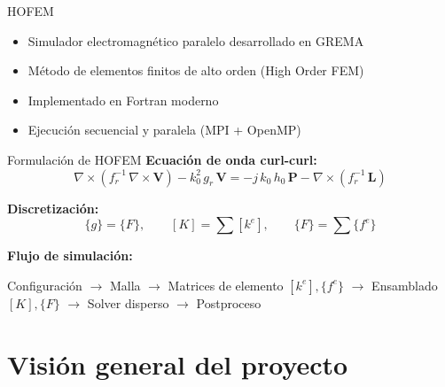 \documentclass[aspectratio=169,11pt]{beamer}
\begin{document}
\begin{frame}{HOFEM}
  \begin{itemize}
    \item Simulador electromagnético paralelo desarrollado en GREMA
    \item Método de elementos finitos de alto orden (High Order FEM)
    \item Implementado en Fortran moderno
    \item Ejecución secuencial y paralela (MPI + OpenMP)
  \end{itemize}
\end{frame}

\begin{frame}{Formulación de HOFEM}
  \textbf{Ecuación de onda curl-curl:}
  \begin{equation*}
    \nabla \times \left(f_r^{-1}\, \nabla \times \mathbf{V}\right)
    - k_0^2\, g_r\, \mathbf{V}
    = -j\, k_0\, h_0\, \mathbf{P}
    - \nabla \times \left(f_r^{-1}\, \mathbf{L}\right)
  \end{equation*}

  \textbf{Discretización:}
  \begin{equation*}
    [K]\{g\} = \{F\}, \qquad
    [K] = \sum [k^e], \qquad
    \{F\} = \sum \{f^e\}
  \end{equation*}

  \textbf{Flujo de simulación:}
  \begin{center}
    \footnotesize
    Configuración $\to$ Malla $\to$ Matrices de elemento $[k^e],\{f^e\}$
    $\to$ Ensamblado $[K],\{F\}$ $\to$ Solver disperso $\to$ Postproceso
  \end{center}
\end{frame}

\section{Visión general del proyecto}
\end{document}
